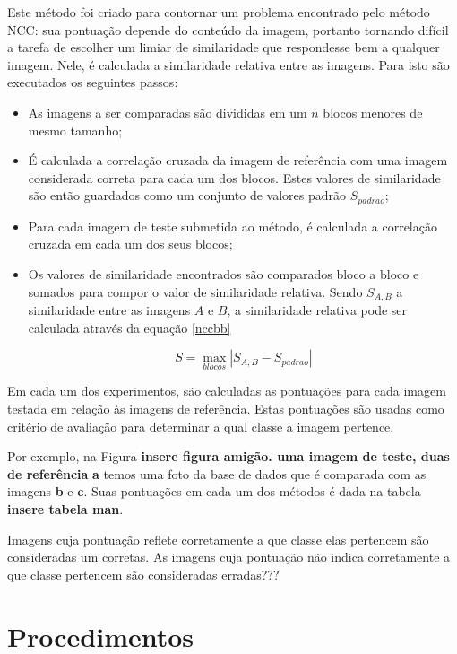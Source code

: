 Este método foi criado para contornar um problema encontrado pelo método NCC: sua pontuação depende do conteúdo da imagem, portanto tornando difícil a tarefa de escolher um limiar de similaridade que respondesse bem a qualquer imagem. Nele, é calculada a similaridade relativa entre as imagens.
Para isto são executados os seguintes passos:
\begin{itemize}
\item As imagens a ser comparadas são divididas em um $n$ blocos menores de mesmo tamanho;
\item É calculada a correlação cruzada da imagem de referência com uma imagem considerada correta para cada um dos blocos. Estes valores de similaridade são então guardados como um conjunto de valores padrão $S_{padrao}$;
\item Para cada imagem de teste submetida ao método, é calculada a correlação cruzada em cada um dos seus blocos;
\item Os valores de similaridade encontrados são comparados bloco a bloco e somados para compor o valor de similaridade relativa. Sendo $S_{A,B}$ a similaridade entre as imagens $A$ e $B$, a similaridade relativa pode ser calculada através da equação \ref{nccbb}

\begin{equation}
S = \max_{blocos}|S_{A,B} - S_{padrao}| \label{nccbb}
\end{equation}

\end{itemize}

Em cada um dos experimentos, são calculadas as pontuações para cada imagem testada em relação às imagens de referência. Estas pontuações são usadas como critério de avaliação para determinar a qual classe a imagem pertence. 


Por exemplo, na Figura \textbf{insere figura amigão. uma imagem de teste, duas de referência} \textbf{a} temos uma foto da base de dados que é comparada com as imagens \textbf{b} e \textbf{c}. Suas pontuações em cada um dos métodos é dada na tabela \textbf{insere tabela man}.

Imagens cuja pontuação reflete corretamente a que classe elas pertencem são consideradas um corretas. As imagens cuja pontuação não indica corretamente a que classe pertencem são consideradas erradas???


\section{Procedimentos}

